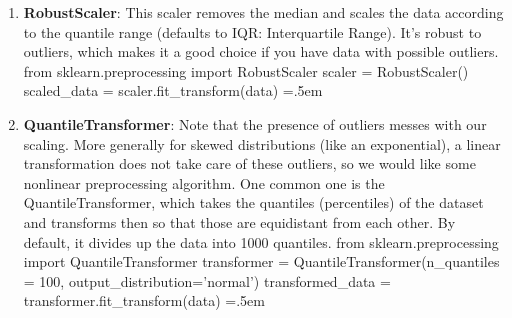 \documentclass{article}
\theoremstyle{definition}
\newenvironment{cverbatim}
    {\SaveVerbatim{cverb}}
    {\endSaveVerbatim
    \flushleft\fboxrule=0pt\fboxsep=.5em
    \colorbox{cverbbg}{%
      \makebox[\dimexpr\linewidth-2\fboxsep][l]{\BUseVerbatim{cverb}}%
    }
    \endflushleft
  }
\begin{document}
\begin{enumerate}
        \item \textbf{RobustScaler}: This scaler removes the median and scales the data according to the quantile range (defaults to IQR: Interquartile Range). It's robust to outliers, which makes it a good choice if you have data with possible outliers. 
        \begin{cverbatim}
        from sklearn.preprocessing import RobustScaler
        scaler = RobustScaler()
        scaled_data = scaler.fit_transform(data)
        \end{cverbatim} 

        \item \textbf{QuantileTransformer}: Note that the presence of outliers messes with our scaling. More generally for skewed distributions (like an exponential), a linear transformation does not take care of these outliers, so we would like some nonlinear preprocessing algorithm. One common one is the QuantileTransformer, which takes the quantiles (percentiles) of the dataset and transforms then so that those are equidistant from each other. By default, it divides up the data into 1000 quantiles. 
        \begin{cverbatim}
        from sklearn.preprocessing import QuantileTransformer
        transformer = QuantileTransformer(n_quantiles = 100, output_distribution='normal')
        transformed_data = transformer.fit_transform(data)
        \end{cverbatim}
    \end{enumerate}
\end{document}
